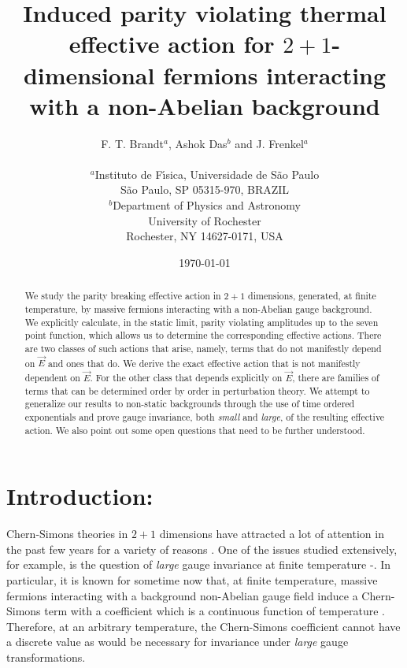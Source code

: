 \documentclass[a4paper,12pt]{article}
\begin{document}
\title{Induced parity violating thermal effective action for
$2+1$-dimensional fermions interacting with a non-Abelian background}

\author{F. T. Brandt$^a$, Ashok Das$^b$ and J. Frenkel$^a$
\\ \\
$^a$Instituto de F\'{\i}sica,
Universidade de S\~ao Paulo\\
S\~ao Paulo, SP 05315-970, BRAZIL\\
$^b$Department of Physics and Astronomy\\
University of Rochester\\
Rochester, NY 14627-0171, USA}
\date{\today}
\maketitle

\begin{abstract}
We study the parity breaking effective action in $2+1$ dimensions,
generated, at finite temperature, by massive fermions interacting with
a non-Abelian gauge background. We explicitly calculate, in the static
limit, parity violating amplitudes up to the seven point
function, which allows us to determine the corresponding effective
actions. There are two classes of such actions that arise, namely,
terms that do not manifestly depend on $\vec{E}$ and ones that do. We
derive the exact effective action that is not manifestly dependent on
$\vec{E}$. For the other class that depends explicitly on
$\vec{E}$,  there are families of terms that
can be determined order by order in perturbation theory. We attempt to
generalize
our results to non-static backgrounds through the use of time ordered
exponentials and prove gauge invariance, both {\it small} and {\it
  large}, of the resulting effective action. We also point out some open
questions that need to be further understood.
\end{abstract}
\newpage
\section{Introduction:}
Chern-Simons theories in $2+1$ dimensions
\cite{chern:1974,Deser:1982wh} have  attracted a lot of
attention  in the past few years for a variety of reasons 
\cite{dunne:leshouches}.
One of the issues  studied extensively, for example, is the question
of  {\it  large}  gauge invariance at finite temperature
\cite{babu:1987rs}-\cite{cdfosco}.
In particular, it is known for sometime now that, at
finite temperature, massive fermions interacting with a background
non-Abelian gauge field induce a Chern-Simons term with a coefficient
which is a continuous function of temperature \cite{babu:1987rs}.
Therefore, at an
arbitrary temperature, the Chern-Simons coefficient cannot have a
discrete value as would be necessary for invariance under {\it large}
gauge transformations.
\end{document}
